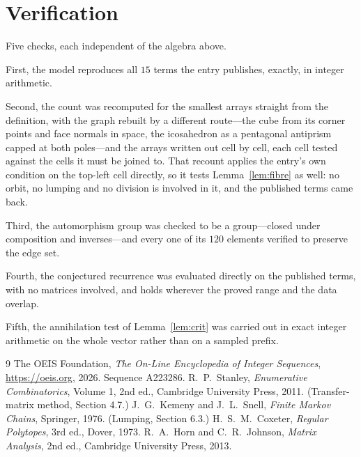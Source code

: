 \documentclass[11pt,a4paper]{article}
\theoremstyle{plain}
\theoremstyle{definition}
\begin{document}
\section{Verification}

Five checks, each independent of the algebra above.

First, the model reproduces all $15$ terms the entry publishes, exactly, in integer
arithmetic.

Second, the count was recomputed for the smallest arrays straight from the definition, with the
graph rebuilt by a different route---the cube from its corner points and face normals in space,
the icosahedron as a pentagonal antiprism capped at both poles---and the arrays written out cell
by cell, each cell tested against the cells it must be joined to. That recount applies the
entry's own condition on the top-left cell directly, so it tests Lemma~\ref{lem:fibre} as well:
no orbit, no lumping and no division is involved in it, and the published terms came back.

Third, the automorphism group was checked to be a group---closed under composition and
inverses---and every one of its $120$ elements verified to preserve the edge set.

Fourth, the conjectured recurrence was evaluated directly on the published terms, with no
matrices involved, and holds wherever the proved range and the data overlap.

Fifth, the annihilation test of Lemma~\ref{lem:crit} was carried out in exact integer
arithmetic on the whole vector rather than on a sampled prefix.

\begin{thebibliography}{9}
 The OEIS Foundation, \emph{The On-Line Encyclopedia of Integer
Sequences}, \url{https://oeis.org}, 2026. Sequence A223286.
 R.~P.~Stanley, \emph{Enumerative Combinatorics}, Volume 1, 2nd ed.,
Cambridge University Press, 2011. (Transfer-matrix method, Section 4.7.)
 J.~G.~Kemeny and J.~L.~Snell, \emph{Finite Markov Chains}, Springer, 1976.
(Lumping, Section 6.3.)
 H.~S.~M.~Coxeter, \emph{Regular Polytopes}, 3rd ed., Dover, 1973.
 R.~A.~Horn and C.~R.~Johnson, \emph{Matrix Analysis}, 2nd ed., Cambridge
University Press, 2013.
\end{thebibliography}
\end{document}
